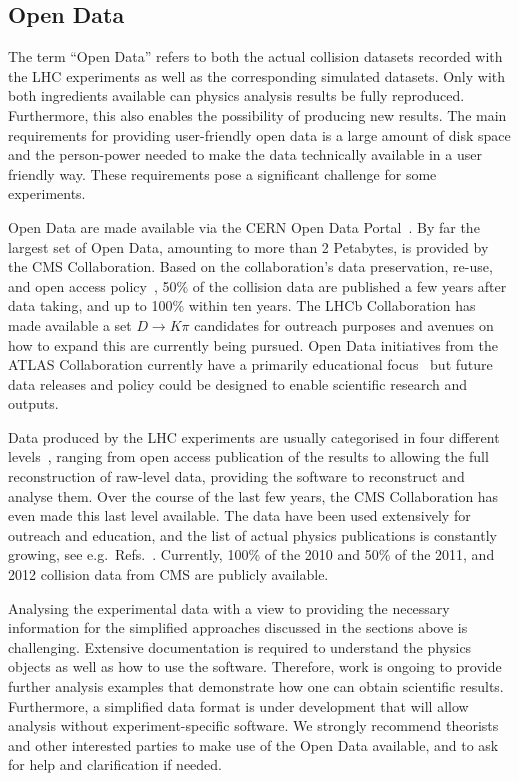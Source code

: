 \documentclass[a4paper,aps,prd,longbibliography,notitlepage,showpacs,amsmath,amssymb,superscriptaddress,nofootinbib,floatfix,11pt,preprintnumbers]{revtex4-1-mod}
\newcommand{\eg}{e.g.\xspace}
\begin{document}
\subsection{Open Data}\label{sec:opendata}

The term ``Open Data'' refers to both the actual collision datasets recorded with the LHC experiments as well as the corresponding simulated datasets. Only with both ingredients available can physics analysis results be fully reproduced. Furthermore, this also enables the possibility of producing new results.
%
The main requirements for providing user-friendly open data is a large amount of disk space and the person-power needed to make the data technically available in a user friendly way. These requirements pose a significant challenge for some experiments.

Open Data are made available via the CERN Open Data Portal~\cite{OpenDataPortal}. By far the largest set of Open Data, amounting to more than 2 Petabytes, is provided by the CMS Collaboration. Based on the collaboration's data preservation, re-use, and open access policy~\cite{CMSOpenDataPolicy}, 50\% of the collision data are published a few years after data taking, and up to 100\% within ten years. The LHCb Collaboration has made available a set $D\to K \pi$ candidates for outreach purposes and avenues on how to expand this are currently being pursued. Open Data initiatives from the ATLAS Collaboration currently have a primarily educational focus~\cite{ATLASOpenDataAccessPolicy} but future data releases and policy could be designed to enable scientific research and outputs.

Data produced by the LHC experiments are usually categorised in four different levels~\cite{Mount:2009aa}, ranging from open access publication of the results to allowing the full reconstruction of raw-level data, providing the software to reconstruct and analyse them. Over the course of the last few years, the CMS Collaboration has even made this last level available. The data have been used extensively for outreach and education, and the list of actual physics publications is constantly growing, see \eg~Refs.~\cite{Larkoski:2017bvj,Tripathee:2017ybi,Cesarotti:2019nax,Lester:2019bso,Apyan:2019ybx,Komiske:2019jim}. Currently, 100\% of the 2010 and 50\% of the 2011, and 2012 collision data from CMS are publicly available.

Analysing the experimental data with a view to providing the necessary information for the simplified approaches discussed in the sections above is challenging. Extensive documentation is required to understand the physics objects as well as how to use the software. Therefore, work is ongoing to provide further analysis examples that demonstrate how one can obtain scientific results. Furthermore, a simplified data format is under development that will allow analysis without experiment-specific software. We strongly recommend theorists and other interested parties to make use of the Open Data available, and to ask for help and clarification if needed.
\end{document}
